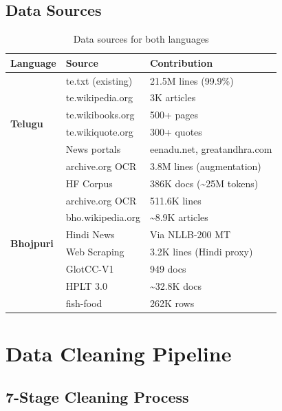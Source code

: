 \documentclass[11pt,a4paper]{article}
\begin{document}
\subsection{Data Sources}

\begin{table}[H]
    \centering
    \small
    \begin{tabular}{|l|l|l|}
    \hline
    \textbf{Language} & \textbf{Source} & \textbf{Contribution} \\
    \hline
    \multirow{6}{*}{\textbf{Telugu}} & te.txt (existing) & 21.5M lines (99.9\%) \\
     & te.wikipedia.org & 3K articles \\
     & te.wikibooks.org & 500+ pages \\
     & te.wikiquote.org & 300+ quotes \\
     & News portals & eenadu.net, greatandhra.com \\
     & archive.org OCR & 3.8M lines (augmentation) \\
    \hline
    \multirow{8}{*}{\textbf{Bhojpuri}} & HF Corpus & 386K docs (\textasciitilde25M tokens) \\
     & archive.org OCR & 511.6K lines \\
     & bho.wikipedia.org & \textasciitilde8.9K articles \\
     & Hindi News & Via NLLB-200 MT \\
     & Web Scraping & 3.2K lines (Hindi proxy) \\
     & GlotCC-V1 & 949 docs \\
     & HPLT 3.0 & \textasciitilde32.8K docs \\
     & fish-food & 262K rows \\
    \hline
    \end{tabular}
    \caption{Data sources for both languages}
    \label{tab:datasources}
\end{table}

\section{Data Cleaning Pipeline}

\subsection{7-Stage Cleaning Process}
\end{document}
